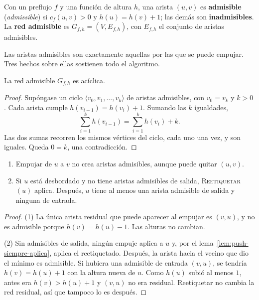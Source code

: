 \documentclass[11pt,letterpaper]{article}
\begin{document}
\begin{definicion}
  \label{def:arista-admisible}
  Con un preflujo $f$ y una función de altura $h$, una arista $(u, v)$
  es \textbf{admisible} (\textit{admissible}) si $c_f(u, v) > 0$ y
  $h(u) = h(v) + 1$; las demás son \textbf{inadmisibles}. La
  \textbf{red admisible} es $G_{f,h} = (V, E_{f,h})$, con $E_{f,h}$ el
  conjunto de aristas admisibles.
\end{definicion}

Las aristas admisibles son exactamente aquellas por las que se puede
empujar. Tres hechos sobre ellas sostienen todo el algoritmo.

\begin{lema}
  \label{lem:push-admisible-aciclica}
  La red admisible $G_{f,h}$ es acíclica.
\end{lema}

\begin{proof}
  Supóngase un ciclo $\langle v_0, v_1, \dots, v_k\rangle$ de aristas
  admisibles, con $v_0 = v_k$ y $k > 0$. Cada arista cumple
  $h(v_{i-1}) = h(v_i) + 1$. Sumando las $k$ igualdades,
  \[
    \sum_{i=1}^{k} h(v_{i-1}) = \sum_{i=1}^{k} h(v_i) + k .
  \]
  Las dos sumas recorren los mismos vértices del ciclo, cada uno una
  vez, y son iguales. Queda $0 = k$, una contradicción.
\end{proof}

\begin{lema}
  \label{lem:push-tras-reetiquetar}
  \begin{enumerate}
    \item Empujar de $u$ a $v$ no crea aristas admisibles, aunque puede
          quitar $(u, v)$.
    \item Si $u$ está desbordado y no tiene aristas admisibles de
          salida, \textsc{Reetiquetar}$(u)$ aplica. Después, $u$ tiene
          al menos una arista admisible de salida y ninguna de entrada.
  \end{enumerate}
\end{lema}

\begin{proof}
  (1) La única arista residual que puede aparecer al empujar es
  $(v, u)$, y no es admisible porque $h(v) = h(u) - 1$. Las alturas
  no cambian.

  (2) Sin admisibles de salida, ningún empuje aplica a $u$ y, por el
  lema~\ref{lem:push-siempre-aplica}, aplica el reetiquetado. Después,
  la arista hacia el vecino que dio el mínimo es admisible. Si hubiera
  una admisible de entrada $(v, u)$, se tendría $h(v) = h(u) + 1$ con
  la altura nueva de $u$. Como $h(u)$ subió al menos $1$, antes era
  $h(v) > h(u) + 1$ y $(v, u)$ no era residual. Reetiquetar no cambia
  la red residual, así que tampoco lo es después.
\end{proof}
\end{document}
